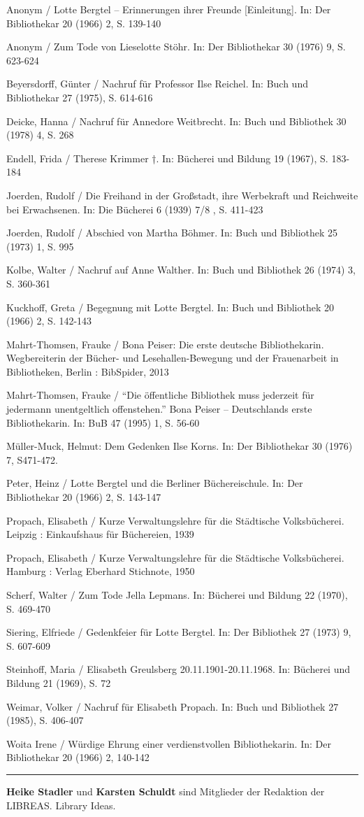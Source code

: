 \documentclass[a4paper,
fontsize=11pt,
oneside,
numbers=noperiodatend,
parskip=half-,
bibliography=totoc,
final
]{scrartcl}
\begin{document}
Anonym / Lotte Bergtel -- Erinnerungen ihrer Freunde {[}Einleitung{]}.
In: Der Bibliothekar 20 (1966) 2, S. 139-140

Anonym / Zum Tode von Lieselotte Stöhr. In: Der Bibliothekar 30 (1976)
9, S. 623-624

Beyersdorff, Günter / Nachruf für Professor Ilse Reichel. In: Buch und
Bibliothekar 27 (1975), S. 614-616

Deicke, Hanna / Nachruf für Annedore Weitbrecht. In: Buch und Bibliothek
30 (1978) 4, S. 268

Endell, Frida / Therese Krimmer †. In: Bücherei und Bildung 19 (1967),
S. 183-184

Joerden, Rudolf / Die Freihand in der Großstadt, ihre Werbekraft und
Reichweite bei Erwachsenen. In: Die Bücherei 6 (1939) 7/8 , S. 411-423

Joerden, Rudolf / Abschied von Martha Böhmer. In: Buch und Bibliothek 25
(1973) 1, S. 995

Kolbe, Walter / Nachruf auf Anne Walther. In: Buch und Bibliothek 26
(1974) 3, S. 360-361

Kuckhoff, Greta / Begegnung mit Lotte Bergtel. In: Buch und Bibliothek
20 (1966) 2, S. 142-143

Mahrt-Thomsen, Frauke / Bona Peiser: Die erste deutsche Bibliothekarin.
Wegbereiterin der Bücher- und Lesehallen-Bewegung und der Frauenarbeit
in Bibliotheken, Berlin : BibSpider, 2013

Mahrt-Thomsen, Frauke / \enquote{Die öffentliche Bibliothek muss
jederzeit für jedermann unentgeltlich offenstehen.} Bona Peiser --
Deutschlands erste Bibliothekarin. In: BuB 47 (1995) 1, S. 56-60

Müller-Muck, Helmut: Dem Gedenken Ilse Korns. In: Der Bibliothekar 30
(1976) 7, S471-472.

Peter, Heinz / Lotte Bergtel und die Berliner Büchereischule. In: Der
Bibliothekar 20 (1966) 2, S. 143-147

Propach, Elisabeth / Kurze Verwaltungslehre für die Städtische
Volksbücherei. Leipzig : Einkaufshaus für Büchereien, 1939

Propach, Elisabeth / Kurze Verwaltungslehre für die Städtische
Volksbücherei. Hamburg : Verlag Eberhard Stichnote, 1950

Scherf, Walter / Zum Tode Jella Lepmans. In: Bücherei und Bildung 22
(1970), S. 469-470

Siering, Elfriede / Gedenkfeier für Lotte Bergtel. In: Der Bibliothek 27
(1973) 9, S. 607-609

Steinhoff, Maria / Elisabeth Greulsberg 20.11.1901-20.11.1968. In:
Bücherei und Bildung 21 (1969), S. 72

Weimar, Volker / Nachruf für Elisabeth Propach. In: Buch und Bibliothek
27 (1985), S. 406-407

Woita Irene / Würdige Ehrung einer verdienstvollen Bibliothekarin. In:
Der Bibliothekar 20 (1966) 2, 140-142

\begin{center}\rule{3in}{0.4pt}\end{center}

\textbf{Heike Stadler} und \textbf{Karsten Schuldt} sind Mitglieder der
Redaktion der LIBREAS. Library Ideas.
\end{document}
